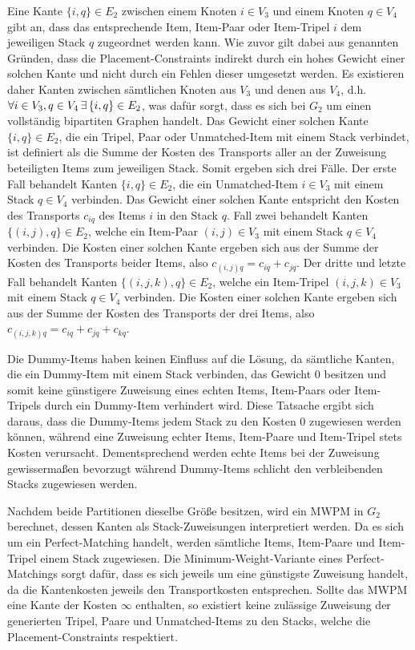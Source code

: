 Eine Kante $\{i, q\} \in E_2$ zwischen einem Knoten $i \in V_3$ und einem Knoten $q \in V_4$ gibt an, dass das entsprechende Item, Item-Paar oder Item-Tripel $i$ dem jeweiligen Stack $q$ zugeordnet werden kann. Wie zuvor gilt dabei
aus genannten Gründen, dass die Placement-Constraints indirekt durch ein hohes Gewicht einer solchen Kante und nicht durch ein Fehlen dieser
umgesetzt werden. Es existieren daher Kanten zwischen sämtlichen Knoten aus $V_3$ und denen aus $V_4$, d.h. $\forall i \in V_3, q \in V_4
\thinspace \exists \thinspace \{i, q\} \in E_2$, was dafür sorgt, dass es sich bei $G_2$ um einen vollständig bipartiten Graphen handelt.
Das Gewicht einer solchen Kante $\{i, q\} \in E_2$, die ein Tripel, Paar oder Unmatched-Item mit einem Stack verbindet, ist definiert
als die Summe der Kosten des Transports aller an der Zuweisung beteiligten Items zum jeweiligen Stack. Somit ergeben sich drei Fälle.
Der erste Fall behandelt Kanten $\{i, q\} \in E_2$, die ein Unmatched-Item $i \in V_3$ mit einem Stack $q \in V_4$ verbinden.
Das Gewicht einer solchen Kante entspricht den Kosten des Transports $c_{iq}$ des Items $i$ in den Stack $q$.
Fall zwei behandelt Kanten $\{(i, j), q\} \in E_2$, welche ein Item-Paar $(i, j) \in V_3$ mit einem Stack $q \in V_4$
verbinden. Die Kosten einer solchen Kante ergeben sich aus der Summe der Kosten des Transports beider Items,
also $c_{(i, j)q} = c_{iq} + c_{jq}$.
Der dritte und letzte Fall behandelt Kanten $\{(i, j, k), q\} \in E_2$, welche ein Item-Tripel $(i, j, k) \in V_3$
mit einem Stack $q \in V_4$ verbinden. Die Kosten einer solchen Kante ergeben sich aus der Summe der Kosten des Transports
der drei Items, also $c_{(i, j, k)q} = c_{iq} + c_{jq} + c_{kq}$.

Die Dummy-Items haben keinen Einfluss auf die Lösung, da sämtliche Kanten, die ein Dummy-Item mit einem Stack verbinden,
das Gewicht $0$ besitzen und somit keine günstigere Zuweisung eines echten Items, Item-Paars oder Item-Tripels durch ein Dummy-Item
verhindert wird. Diese Tatsache ergibt sich daraus, dass die Dummy-Items jedem Stack zu den Kosten $0$ zugewiesen werden können,
während eine Zuweisung echter Items, Item-Paare und Item-Tripel stets Kosten verursacht. Dementsprechend werden echte Items bei der
Zuweisung gewissermaßen bevorzugt während Dummy-Items schlicht den verbleibenden Stacks zugewiesen werden.

Nachdem beide Partitionen dieselbe Größe besitzen, wird ein \textsc{MWPM} in $G_2$ berechnet, dessen Kanten
als Stack-Zuweisungen interpretiert werden. Da es sich um ein Perfect-Matching handelt, werden sämtliche Items, Item-Paare
und Item-Tripel einem Stack zugewiesen. Die Minimum-Weight-Variante eines Perfect-Matchings sorgt dafür, dass es sich
jeweils um eine günstigste Zuweisung handelt, da die Kantenkosten jeweils den Transportkosten entsprechen.
Sollte das \textsc{MWPM} eine Kante der Kosten $\infty$ enthalten, so existiert keine zulässige Zuweisung
der generierten Tripel, Paare und Unmatched-Items zu den Stacks, welche die Placement-Constraints respektiert.


